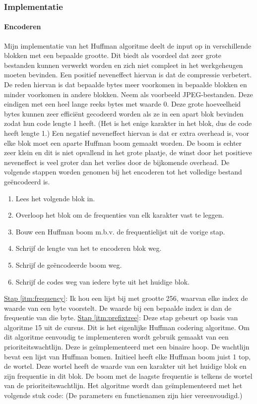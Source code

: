 \documentclass[11pt, a4paper]{article}
\begin{document}
\subsubsection{Implementatie}

\paragraph{Encoderen}
Mijn implementatie van het Huffman algoritme deelt de input op in verschillende blokken met een bepaalde grootte. Dit biedt als voordeel dat zeer grote bestanden kunnen verwerkt worden en zich niet compleet in het werkgeheugen moeten bevinden. Een positief neveneffect hiervan is dat de compressie verbetert. De reden hiervan is dat bepaalde bytes meer voorkomen in bepaalde blokken en minder voorkomen in andere blokken. Neem als voorbeeld JPEG-bestanden. Deze eindigen met een heel lange reeks bytes met waarde 0. Deze grote hoeveelheid bytes kunnen zeer effici\"{e}nt gecodeerd worden als ze in een apart blok bevinden zodat hun code lengte 1 heeft. (Het is het enige karakter in het blok, dus de code heeft lengte 1.) Een negatief neveneffect hiervan is dat er extra overhead is, voor elke blok moet een aparte Huffman boom gemaakt worden. De boom is echter zeer klein en dit is niet opvallend in het grote plaatje, de winst door het positieve neveneffect is veel groter dan het verlies door de bijkomende overhead. De volgende stappen worden genomen bij het encoderen tot het volledige bestand ge\"{e}ncodeerd is.
\begin{enumerate}
	\item \label{itm:read} Lees het volgende blok in. 
	\item \label{itm:frequency} Overloop het blok om de frequenties van elk karakter vast te leggen.
	\item \label{itm:prefixtree} Bouw een Huffman boom m.b.v. de frequentielijst uit de vorige stap.
	\item \label{itm:writelength} Schrijf de lengte van het te encoderen blok weg. 
	\item \label{itm:writetree} Schrijf de ge\"{e}ncodeerde boom weg.
	\item \label{itm:writecode} Schrijf de codes weg van iedere byte uit het huidige blok.
\end{enumerate}
\underline{Stap \ref{itm:frequency}}: Ik hou een lijst bij met grootte 256, waarvan elke index de waarde van een byte voorstelt. De waarde bij een bepaalde index is dan de frequentie van die byte.
\newline\underline{Stap \ref{itm:prefixtree}}: Deze stap gebeurt op basis van algoritme 15 uit de cursus. Dit is het eigenlijke Huffman codering algoritme. Om dit algoritme eenvoudig te implementeren wordt gebruik gemaakt van een prioriteitswachtlijn. Deze is ge\"{i}mplementeerd met een binaire hoop. De wachtlijn bevat een lijst van Huffman bomen. Initieel heeft elke Huffman boom juist 1 top, de wortel. Deze wortel heeft de waarde van een karakter uit het huidige blok en zijn frequentie in dit blok. De boom met de laagste frequentie is telkens de wortel van de prioriteitswachtlijn. Het algoritme wordt dan ge\"{i}mplementeerd met het volgende stuk code: (De parameters en functienamen zijn hier vereenvoudigd.) 
\end{document}
